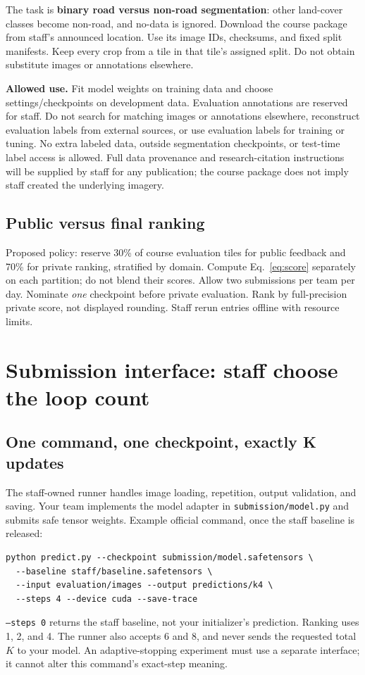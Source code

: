 \documentclass[11pt,letterpaper]{article}
\newcommand{\page}[1]{\clearpage\section{#1}}
\begin{document}
The task is \textbf{binary road versus non-road segmentation}: other land-cover classes become non-road, and no-data is ignored. Download the course package from staff's announced location. Use its image IDs, checksums, and fixed split manifests. Keep every crop from a tile in that tile's assigned split. Do not obtain substitute images or annotations elsewhere.

\textbf{Allowed use.} Fit model weights on training data and choose settings/checkpoints on development data. Evaluation annotations are reserved for staff. Do not search for matching images or annotations elsewhere, reconstruct evaluation labels from external sources, or use evaluation labels for training or tuning. No extra labeled data, outside segmentation checkpoints, or test-time label access is allowed. Full data provenance and research-citation instructions will be supplied by staff for any publication; the course package does not imply staff created the underlying imagery.

\subsection{Public versus final ranking}
Proposed policy: reserve 30\% of course evaluation tiles for public feedback and 70\% for private ranking, stratified by domain. Compute Eq.~\eqref{eq:score} separately on each partition; do not blend their scores. Allow two submissions per team per day. Nominate \emph{one} checkpoint before private evaluation. Rank by full-precision private score, not displayed rounding. Staff rerun entries offline with resource limits.

\page{Submission interface: staff choose the loop count}
\subsection{One command, one checkpoint, exactly K updates}
The staff-owned runner handles image loading, repetition, output validation, and saving. Your team implements the model adapter in \texttt{submission/model.py} and submits safe tensor weights. Example official command, once the staff baseline is released:
\begin{lstlisting}
python predict.py --checkpoint submission/model.safetensors \
  --baseline staff/baseline.safetensors \
  --input evaluation/images --output predictions/k4 \
  --steps 4 --device cuda --save-trace
\end{lstlisting}
\texttt{--steps 0} returns the staff baseline, not your initializer's prediction. Ranking uses 1, 2, and 4. The runner also accepts 6 and 8, and never sends the requested total $K$ to your model. An adaptive-stopping experiment must use a separate interface; it cannot alter this command's exact-step meaning.
\end{document}

